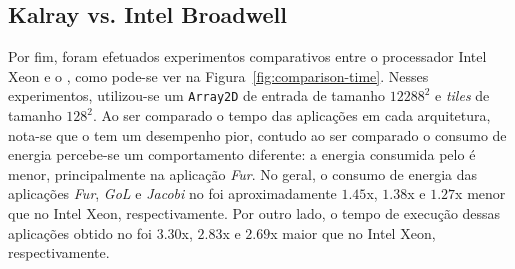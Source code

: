\subsection{Kalray \mppa vs. Intel Broadwell}


Por fim, foram efetuados experimentos comparativos entre o processador Intel
Xeon e o \mppa, como pode-se ver na Figura~\ref{fig:comparison-time}. Nesses
experimentos, utilizou-se um \texttt{Array2D} de entrada de tamanho $12288^2$ e
\textit{tiles} de tamanho $128^2$. Ao ser comparado o tempo das aplicações em
cada arquitetura, nota-se que o \mppa tem um desempenho pior, contudo ao ser
comparado o consumo de energia percebe-se um comportamento diferente: a energia
consumida pelo \mppa é menor, principalmente na aplicação \textit{Fur}. No
geral, o consumo de energia das aplicações \textit{Fur}, \textit{GoL} e
\textit{Jacobi} no \mppa foi aproximadamente $1.45$x, $1.38$x e $1.27$x menor
que no Intel Xeon, respectivamente. Por outro lado, o tempo de execução dessas
aplicações obtido no \mppa foi  $3.30$x, $2.83$x e $2.69$x maior que no Intel
Xeon, respectivamente.



